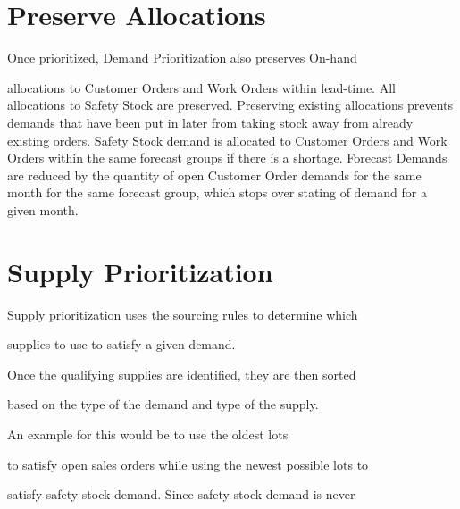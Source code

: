 \documentclass[letterpaper,10pt,english]{sphinxmanual}
\begin{document}
\section{Preserve Allocations}
\label{APS/APS-Features-and-Benefits:preserve-allocations}
\begin{DUlineblock}{0em}
\item[] Once prioritized, Demand Prioritization also preserves On-hand
\end{DUlineblock}

allocations to
\textbar{} Customer Orders and Work Orders within lead-time. All allocations to
\textbar{} Safety Stock are preserved. Preserving existing allocations prevents
\textbar{} demands that have been put in later from taking stock away from
already
\textbar{} existing orders. Safety Stock demand is allocated to Customer Orders
and
\textbar{} Work Orders within the same forecast groups if there is a shortage.
\textbar{} Forecast Demands are reduced by the quantity of open Customer Order
\textbar{} demands for the same month for the same forecast group, which stops
over
\textbar{} stating of demand for a given month.


\section{Supply Prioritization}
\label{APS/APS-Features-and-Benefits:supply-prioritization}
\begin{DUlineblock}{0em}
\item[] Supply prioritization uses the sourcing rules to determine which
\item[] supplies to use to satisfy a given demand.
\end{DUlineblock}

\begin{DUlineblock}{0em}
\item[] Once the qualifying supplies are identified, they are then sorted
\end{DUlineblock}

based on the type of the demand and
\textbar{} type of the supply.

\begin{DUlineblock}{0em}
\item[] An example for this would be to use the oldest lots
\item[] to satisfy open sales orders while using the newest possible lots to
\item[] satisfy safety stock demand. Since safety stock demand is never
\end{DUlineblock}
\end{document}
